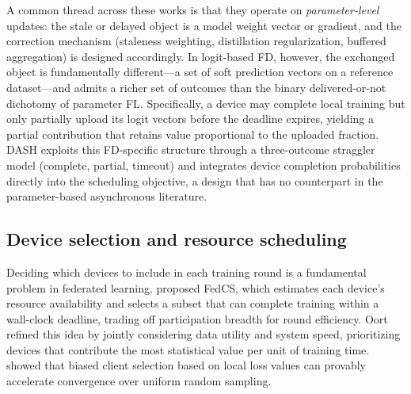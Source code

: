 \documentclass[a4paper,fleqn]{cas-dc}
\begin{document}
	A common thread across these works is that they operate on
	\emph{parameter-level} updates: the stale or delayed object is a model
	weight vector or gradient, and the correction mechanism (staleness
	weighting, distillation regularization, buffered aggregation) is
	designed accordingly. In logit-based FD, however, the exchanged object
	is fundamentally different---a set of soft prediction vectors on a
	reference dataset---and admits a richer set of outcomes than the
	binary delivered-or-not dichotomy of parameter FL. Specifically, a
	device may complete local training but only partially upload its logit
	vectors before the deadline expires, yielding a partial contribution
	that retains value proportional to the uploaded fraction. DASH
	exploits this FD-specific structure through a three-outcome straggler
	model (complete, partial, timeout) and integrates device completion
	probabilities directly into the scheduling objective, a design that
	has no counterpart in the parameter-based asynchronous literature.
	
	\subsection{Device selection and resource scheduling}\label{sec:rw_selection}
	
	Deciding which devices to include in each training round is a
	fundamental problem in federated learning. \citet{nishio_fedcs_2019} proposed FedCS, which estimates
	each device's resource availability and selects a subset that can
	complete training within a wall-clock deadline, trading off
	participation breadth for round efficiency.
	Oort~\citep{lai_oort_2021} refined this idea by jointly considering
	data utility and system speed, prioritizing devices that contribute
	the most statistical value per unit of training time.
	\citet{cho_biased_2022} showed that biased client selection
	based on local loss values can provably accelerate convergence over
	uniform random sampling.
	
\end{document}

